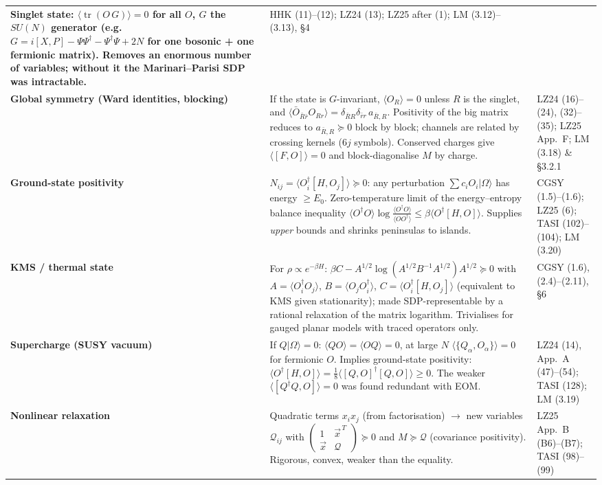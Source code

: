 \documentclass[10pt,a4paper]{article}
\newcommand{\tr}{\operatorname{tr}}
\newcommand{\ev}[1]{\langle #1\rangle}
\begin{document}
\begin{tabularx}{\textwidth}{@{}>{\bfseries}p{2.9cm}Xp{3.6cm}@{}}
Singlet state: $\ev{\tr(O\,G)}=0$ for all $O$, $G$ the $SU(N)$ generator (e.g.\ $G=i[X,P]-\Psi\Psi^\dagger-\Psi^\dagger\Psi+2N$ for one bosonic + one fermionic matrix). Removes an enormous number of variables; without it the Marinari--Parisi SDP was intractable. &
HHK (11)--(12); LZ24 (13); LZ25 after (1); LM (3.12)--(3.13), \S4 \\
Global symmetry (Ward identities, blocking) &
If the state is $G$-invariant, $\ev{O_R}=0$ unless $R$ is the singlet, and $\ev{\bar O_{\bar R\bar r}O_{R r}}=\delta_{\bar RR}\delta_{\bar rr}\,a_{\bar R,R}$. Positivity of the big matrix reduces to $a_{\bar R,R}\succeq0$ block by block; channels are related by crossing kernels ($6j$ symbols). Conserved charges give $\ev{[F,O]}=0$ and block-diagonalise $M$ by charge. &
LZ24 (16)--(24), (32)--(35); LZ25 App.\ F; LM (3.18) \& \S3.2.1 \\
Ground-state positivity &
$N_{ij}=\ev{O_i^\dagger[H,O_j]}\succeq0$: any perturbation $\sum c_iO_i|\Omega\rangle$ has energy $\ge E_0$. Zero-temperature limit of the energy--entropy balance inequality $\ev{O^\dagger O}\log\frac{\ev{O^\dagger O}}{\ev{OO^\dagger}}\le\beta\ev{O^\dagger[H,O]}$. Supplies \emph{upper} bounds and shrinks peninsulas to islands. &
CGSY (1.5)--(1.6); LZ25 (6); TASI (102)--(104); LM (3.20) \\
KMS / thermal state &
For $\rho\propto e^{-\beta H}$: $\beta C-A^{1/2}\log(A^{1/2}B^{-1}A^{1/2})A^{1/2}\succeq0$ with $A=\ev{O_i^\dagger O_j}$, $B=\ev{O_jO_i^\dagger}$, $C=\ev{O_i^\dagger[H,O_j]}$ (equivalent to KMS given stationarity); made SDP-representable by a rational relaxation of the matrix logarithm. Trivialises for gauged planar models with traced operators only. &
CGSY (1.6), (2.4)--(2.11), \S6 \\
Supercharge (SUSY vacuum) &
If $Q|\Omega\rangle=0$: $\ev{QO}=\ev{OQ}=0$, at large $N$ $\ev{\{Q_\alpha,O_\alpha\}}=0$ for fermionic $O$. Implies ground-state positivity: $\ev{O^\dagger[H,O]}=\tfrac18\ev{[Q,O]^\dagger[Q,O]}\ge0$. The weaker $\ev{[Q^\dagger Q,O]}=0$ was found redundant with EOM. &
LZ24 (14), App.\ A (47)--(54); TASI (128); LM (3.19) \\
Nonlinear relaxation &
Quadratic terms $x_ix_j$ (from factorisation) $\to$ new variables $\mathcal Q_{ij}$ with $\begin{pmatrix}1&\vec x^{\,T}\\ \vec x&\mathcal Q\end{pmatrix}\succeq0$ and $M\succeq\mathcal Q$ (covariance positivity). Rigorous, convex, weaker than the equality. &
LZ25 App.\ B (B6)--(B7); TASI (98)--(99) \\
\end{tabularx}
\end{document}
